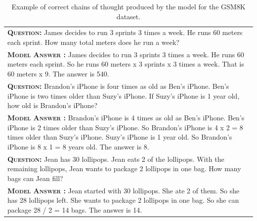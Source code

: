 \begingroup
\begin{table}[h]
    \caption{
    Example of correct chains of thought produced by the model for the GSM8K dataset.
    }
    \vspace{1mm}
    \centering
    \small
    \begin{tabular}{p{\linewidth}}
        \toprule
        \vspace{-2mm}
        \textbf{\textsc{Question:}} James decides to run 3 sprints 3 times a week.  He runs 60 meters each sprint.  How many total meters does he run a week? \\
        \vspace{-1mm}
        \textbf{\textsc{Model Answer \color{darkGreen}{(CORRECT)}:}} James decides to run 3 sprints 3 times a week. He runs 60 meters each sprint. So he runs 60 meters x 3 sprints x 3 times a week. That is 60 meters x 9. The answer is 540. \color{darkGreen}{\checkmark} \\
        \midrule
        \vspace{-2mm}
        \textbf{\textsc{Question:}} Brandon's iPhone is four times as old as Ben's iPhone. Ben's iPhone is two times older than Suzy's iPhone. If Suzy’s iPhone is 1 year old, how old is Brandon’s iPhone? \\
        \vspace{-1mm}
        \textbf{\textsc{Model Answer \color{darkGreen}{(CORRECT)}:}} Brandon's iPhone is 4 times as old as Ben's iPhone. Ben's iPhone is 2 times older than Suzy's iPhone. So Brandon's iPhone is 4 x 2 = 8 times older than Suzy's iPhone. Suzy's iPhone is 1 year old. So Brandon's iPhone is 8 x 1 = 8 years old. The answer is 8. \color{darkGreen}{\checkmark} \\
        \midrule
        \vspace{-2mm}
        \textbf{\textsc{Question:}} Jean has 30 lollipops. Jean eats 2 of the lollipops. With the remaining lollipops, Jean wants to package 2 lollipops in one bag. How many bags can Jean fill? \\
        \vspace{-1mm}
        \textbf{\textsc{Model Answer \color{darkGreen}{(CORRECT)}:}} Jean started with 30 lollipops. She ate 2 of them. So she has 28 lollipops left. She wants to package 2 lollipops in one bag. So she can package 28 / 2 = 14 bags. The answer is 14. \color{darkGreen}{\checkmark} \\
        \bottomrule
    \end{tabular}
    \label{tab:appendix-gsm8k-correct-examples}
\end{table}
\endgroup